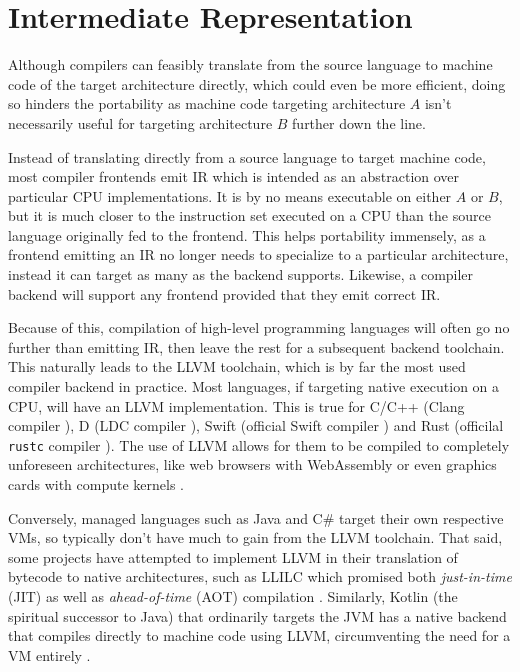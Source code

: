 \documentclass{article}
\begin{document}


\section{Intermediate Representation}


Although compilers can feasibly translate from the source language to machine code of the target architecture directly, which could even be more efficient, doing so hinders the portability as machine code targeting architecture \(A\) isn't necessarily useful for targeting architecture \(B\) further down the line.

Instead of translating directly from a source language to target machine code, most compiler frontends emit IR which is intended as an abstraction over particular CPU implementations. %
It is by no means executable on either \(A\) or \(B\), but it is much closer to the instruction set executed on a CPU than the source language originally fed to the frontend.  This helps portability immensely, as a frontend emitting an IR no longer needs to specialize to a particular architecture, instead it can target as many as the backend supports.
Likewise, a compiler backend will support any frontend provided that they emit correct IR.

Because of this, compilation of high-level programming languages will often go no further than emitting IR, then leave the rest for a subsequent backend toolchain. This naturally leads to the LLVM toolchain, which is by far the most used compiler backend in practice. Most languages, if targeting native execution on a CPU, will have an LLVM implementation. This is true for C/C++ (Clang compiler \cite{clang}), D (LDC compiler \cite{dlang}), Swift (official Swift compiler \cite{swift}) and Rust (officilal \texttt{rustc} compiler \cite{rustc}). The use of LLVM allows for them to be compiled to completely unforeseen architectures, like web browsers with WebAssembly or even graphics cards with compute kernels \cite{backend}.

Conversely, managed languages such as Java and C\# target their own respective VMs, so typically don't have much to gain from the LLVM toolchain. That said, some projects have attempted to implement LLVM in their translation of bytecode to native architectures,  such as LLILC which promised both \textit{just-in-time} (JIT) as well as \textit{ahead-of-time} (AOT) compilation \cite{dotnet}. Similarly, Kotlin (the spiritual successor to Java) that ordinarily targets the JVM has a native backend that compiles directly to machine code using LLVM, circumventing the need for a VM entirely \cite{kotlin}.
\end{document}
